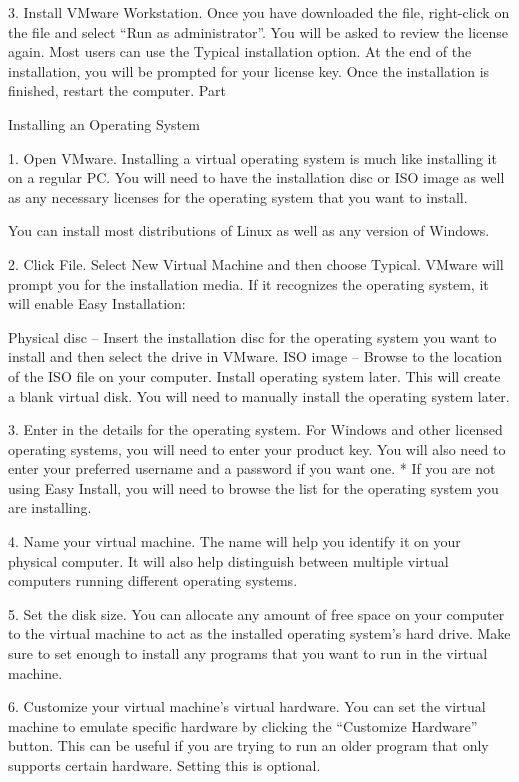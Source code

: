 3. Install VMware Workstation. Once you have downloaded the file, right-click on the file and select “Run as administrator”. You will be asked to review the license again. Most users can use the Typical installation option. At the end of the installation, you will be prompted for your license key. Once the installation is finished, restart the computer. Part

Installing an Operating System


1. Open VMware. Installing a virtual operating system is much like installing it on a regular PC. You will need to have the installation disc or ISO image as well as any necessary licenses for the operating system that you want to install.

You can install most distributions of Linux as well as any version of Windows.


2. Click File. Select New Virtual Machine and then choose Typical. VMware will prompt you for the installation media. If it recognizes the operating system, it will enable Easy Installation:

Physical disc – Insert the installation disc for the operating system you want to install and then select the drive in VMware.
ISO image – Browse to the location of the ISO file on your computer.
Install operating system later. This will create a blank virtual disk. You will need to manually install the operating system later.


3. Enter in the details for the operating system. For Windows and other licensed operating systems, you will need to enter your product key. You will also need to enter your preferred username and a password if you want one. * If you are not using Easy Install, you will need to browse the list for the operating system you are installing.



4. Name your virtual machine. The name will help you identify it on your physical computer. It will also help distinguish between multiple virtual computers running different operating systems.



5. Set the disk size. You can allocate any amount of free space on your computer to the virtual machine to act as the installed operating system’s hard drive. Make sure to set enough to install any programs that you want to run in the virtual machine.



6. Customize your virtual machine’s virtual hardware. You can set the virtual machine to emulate specific hardware by clicking the “Customize Hardware” button. This can be useful if you are trying to run an older program that only supports certain hardware. Setting this is optional.



